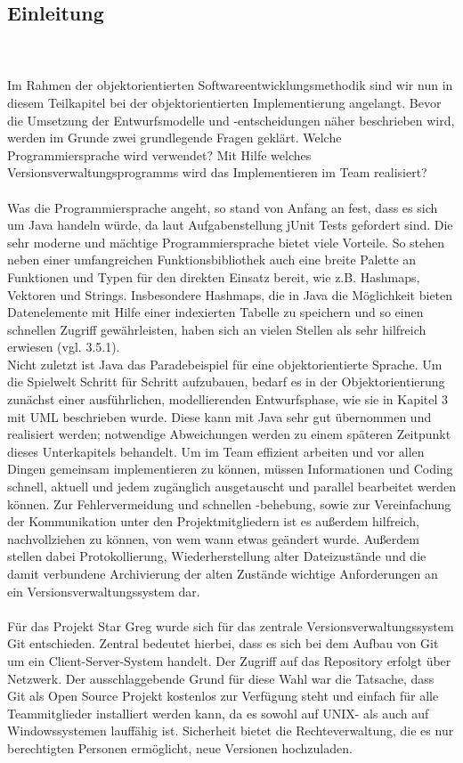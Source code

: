 \subsection{Einleitung}
\label{sub:fachkonzept-implementierung-einleitung}

\\
\\
Im Rahmen der objektorientierten Softwareentwicklungsmethodik sind wir nun in diesem Teilkapitel bei der objektorientierten Implementierung angelangt. Bevor die Umsetzung der Entwurfsmodelle und -entscheidungen näher beschrieben wird, werden im Grunde zwei grundlegende Fragen geklärt. Welche Programmiersprache wird verwendet? Mit Hilfe welches Versionsverwaltungsprogramms wird das Implementieren im Team realisiert?
\\
\\
Was die Programmiersprache angeht, so stand von Anfang an fest, dass es sich um Java handeln würde, da laut Aufgabenstellung jUnit Tests gefordert sind. Die sehr moderne und mächtige Programmiersprache bietet viele Vorteile. So stehen neben einer umfangreichen Funktionsbibliothek auch eine breite Palette an Funktionen und Typen für den direkten Einsatz bereit, wie z.B. Hashmaps, Vektoren und Strings. Insbesondere Hashmaps, die in Java die Möglichkeit bieten Datenelemente mit Hilfe einer indexierten Tabelle zu speichern und so einen schnellen Zugriff gewährleisten, haben sich an vielen Stellen als sehr hilfreich erwiesen (vgl. 3.5.1). 
\\
Nicht zuletzt ist Java das Paradebeispiel für eine objektorientierte Sprache. Um die Spielwelt Schritt für Schritt aufzubauen, bedarf es in der Objektorientierung zunächst einer ausführlichen, modellierenden Entwurfsphase, wie sie in Kapitel 3 mit UML beschrieben wurde. Diese kann mit Java sehr gut übernommen und realisiert werden; notwendige Abweichungen werden zu einem späteren Zeitpunkt dieses Unterkapitels behandelt. 
Um im Team effizient arbeiten und vor allen Dingen gemeinsam implementieren zu können, müssen Informationen und Coding schnell, aktuell und jedem zugänglich ausgetauscht und parallel bearbeitet werden können. Zur Fehlervermeidung und schnellen -behebung, sowie zur Vereinfachung der Kommunikation unter den Projektmitgliedern ist es außerdem hilfreich, nachvollziehen zu können, von wem wann etwas geändert wurde. Außerdem stellen dabei Protokollierung, Wiederherstellung alter Dateizustände und die damit verbundene Archivierung der alten Zustände wichtige Anforderungen an ein Versionsverwaltungssystem dar. 
\\
\\
Für das Projekt Star Greg wurde sich für das zentrale Versionsverwaltungssystem Git entschieden. Zentral bedeutet hierbei, dass es sich bei dem Aufbau von Git um ein Client-Server-System handelt. Der Zugriff auf das Repository erfolgt über Netzwerk. Der ausschlaggebende Grund für diese Wahl war die Tatsache, dass Git als Open Source Projekt kostenlos zur Verfügung steht und einfach für alle Teammitglieder installiert werden kann, da es sowohl auf UNIX- als auch auf Windowssystemen lauffähig ist. Sicherheit bietet die Rechteverwaltung, die es nur berechtigten Personen ermöglicht, neue Versionen hochzuladen. 

